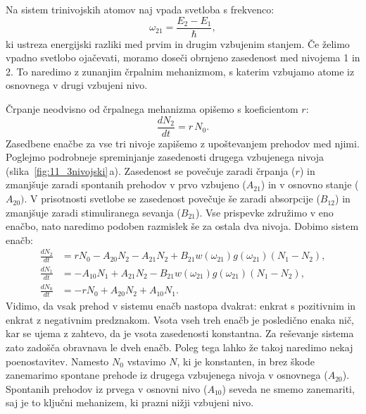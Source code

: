 Na sistem trinivojskih atomov naj vpada svetloba s frekvenco:
\begin{equation}
\omega_{21} = \frac{E_2-E_1}{\hslash},
\label{eq:11_33}
\end{equation}
ki ustreza energijski razliki med prvim in drugim vzbujenim stanjem.  Če želimo
vpadno svetlobo ojačevati, moramo doseči obrnjeno zasedenost med nivojema 1 in 2.
To naredimo z zunanjim črpalnim mehanizmom, s katerim vzbujamo atome 
iz osnovnega v drugi vzbujeni nivo.

Črpanje neodvisno od črpalnega mehanizma
opišemo s koeficientom $r$:
\begin{equation}
\frac{dN_2}{dt} = r\, N_0.
\label{eq:11_34}
\end{equation}
Zasedbene enačbe za vse tri nivoje zapišemo z upoštevanjem prehodov med njimi. 
Poglejmo podrobneje spreminjanje zasedenosti drugega vzbujenega nivoja 
(slika~\ref{fig:11_3nivojski}\,a). Zasedenost
se povečuje zaradi črpanja ($r$) in zmanjšuje zaradi spontanih
prehodov v prvo vzbujeno ($A_{21}$) in v osnovno stanje ($A_{20})$. V prisotnosti
svetlobe se zasedenost povečuje še zaradi absorpcije ($B_{12}$) in zmanjšuje
zaradi stimuliranega sevanja ($B_{21}$). Vse prispevke združimo v eno enačbo, 
nato naredimo podoben razmislek še za ostala dva nivoja. Dobimo sistem enačb:
\begin{align}
\frac{dN_2}{dt} &= rN_0 - A_{20}N_2 - A_{21}N_2 + B_{21}w(\omega_{21})g(\omega_{21}) 
(N_1-N_2),\label{eq:11_35}\\
\frac{dN_1}{dt} &= - A_{10}N_1 + A_{21}N_2 - B_{21}w(\omega_{21})g(\omega_{21}) 
(N_1-N_2),\label{eq:11_36}\\
\frac{dN_0}{dt} &= - rN_0 + A_{20}N_2 + A_{10}N_1.\label{eq:11_37}
\end{align}
Vidimo, da vsak prehod v sistemu enačb nastopa dvakrat: enkrat s pozitivnim 
in enkrat z negativnim predznakom. Vsota vseh treh enačb je posledično enaka 
nič, kar se ujema z zahtevo, da je vsota zasedenosti konstantna. Za reševanje
sistema zato zadošča obravnava le dveh enačb. Poleg tega lahko že takoj 
naredimo nekaj poenostavitev. Namesto $N_0$ vstavimo $N$, ki je konstanten, 
in brez škode zanemarimo spontane prehode iz drugega vzbujenega 
nivoja v osnovnega ($A_{20}$). Spontanih prehodov iz prvega v osnovni 
nivo ($A_{10}$) seveda ne smemo zanemariti, saj je to ključni
mehanizem, ki prazni nižji vzbujeni nivo.


